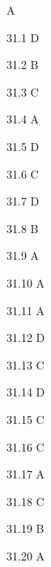 \begin{Solution}{31}
A
\end{Solution}
\begin{Solution}{31.{1}}
D
\end{Solution}
\begin{Solution}{31.{2}}
B
\end{Solution}
\begin{Solution}{31.{3}}
C
\end{Solution}
\begin{Solution}{31.{4}}
A
\end{Solution}
\begin{Solution}{31.{5}}
D
\end{Solution}
\begin{Solution}{31.{6}}
C
\end{Solution}
\begin{Solution}{31.{7}}
D
\end{Solution}
\begin{Solution}{31.{8}}
B
\end{Solution}
\begin{Solution}{31.{9}}
A
\end{Solution}
\begin{Solution}{31.{10}}
A
\end{Solution}
\begin{Solution}{31.{11}}
A
\end{Solution}
\begin{Solution}{31.{12}}
D
\end{Solution}
\begin{Solution}{31.{13}}
C
\end{Solution}
\begin{Solution}{31.{14}}
D
\end{Solution}
\begin{Solution}{31.{15}}
C
\end{Solution}
\begin{Solution}{31.{16}}
C
\end{Solution}
\begin{Solution}{31.{17}}
A
\end{Solution}
\begin{Solution}{31.{18}}
C
\end{Solution}
\begin{Solution}{31.{19}}
B
\end{Solution}
\begin{Solution}{31.{20}}
A
\end{Solution}
